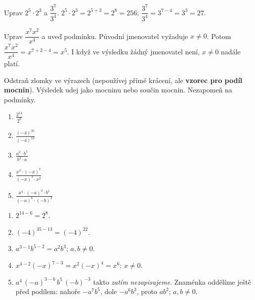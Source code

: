 \documentclass[11pt,a4paper]{article}
\begin{document}
\begin{prikladReseniBox}[title={Příklad 1},breakable=false]
Uprav $2^5\cdot 2^3$ a $\dfrac{3^7}{3^4}$.
\tcblower
$2^5\cdot2^3=2^{5+3}=2^8=256$;
$\dfrac{3^7}{3^4}=3^{7-4}=3^3=27$.
\end{prikladReseniBox}

\begin{prikladReseniBox}[title={Příklad 2},breakable=false]
Uprav $\dfrac{x^7x^2}{x^4}$ a uveď podmínku.
\tcblower
Původní jmenovatel vyžaduje $x\ne0$. Potom
$\dfrac{x^7x^2}{x^4}=x^{7+2-4}=x^5$.
I když ve výsledku žádný jmenovatel není, $x\ne0$ nadále platí.
\end{prikladReseniBox}

\begin{zadaniReseniBox}[title={Samostatná práce 1},breakable=false]
Odstraň zlomky ve výrazech (nepoužívej přímé krácení,
ale \textbf{vzorec pro podíl mocnin}). Výsledek udej jako mocninu
nebo součin mocnin. Nezapomeň na podmínky.
\begin{enumerate}[label=\alph*)]
\item $\displaystyle\frac{2^{14}}{2^6}$
\item $\displaystyle\frac{(-4)^{35}}{(-4)^{13}}$
\item $\displaystyle\frac{a^3\cdot b^5}{b^2\cdot a}$
\item $\displaystyle\frac{x^4\cdot(-x)^7}{(-x)^3\cdot x^2}$
\item $\displaystyle\frac{a^4\cdot(-a)^3\cdot b^5}{(-a)^6\cdot(-b)^3}$
\end{enumerate}
\tcblower
\begin{enumerate}[label=\alph*),itemsep=2pt]
\item $2^{14-6}=\boxed{2^8}$.
\item $(-4)^{35-13}=\boxed{(-4)^{22}}$.
\item $a^{3-1}b^{5-2}=\boxed{a^2b^3}$; $a,b\ne0$.
\item $x^{4-2}(-x)^{7-3}=x^2(-x)^4=\boxed{x^6}$; $x\ne0$.
\item $a^4\,(-a)^{3-6}\,b^5\,(-b)^{-3}$ takto \emph{zatím nezapisujeme}.
Znaménka oddělíme ještě před podílem: nahoře $-a^7b^5$,
dole $-a^6b^3$, proto $\boxed{ab^2}$; $a,b\ne0$.
\end{enumerate}
\end{zadaniReseniBox}
\end{document}
